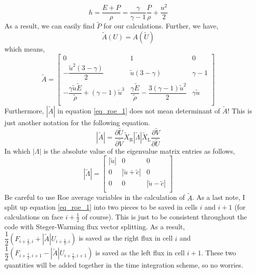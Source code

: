 \documentclass{article}
\begin{document}
\begin{equation*}
h=\dfrac{E+P}{\rho}=\dfrac{\gamma}{\gamma-1}\dfrac{P}{\rho}+\dfrac{u^2}{2}
\end{equation*}
As a result, we can easily find $\tilde{P}$ for our calculations. Further, we have,
\begin{equation*}
\tilde{A}(U)=A(\tilde{U})
\end{equation*}
which means,
\begin{equation*}
\tilde{A}=
\left[
\begin{matrix}
0 & 1 & 0 \\[10pt]
-\dfrac{\tilde{u}^2 (3-\gamma)}{2} & \tilde{u}(3-\gamma)& \gamma-1\\[10pt]
-\dfrac{\gamma \tilde{u} \tilde{E}}{\tilde{\rho}} +(\gamma-1) \tilde{u}^3 & \dfrac{\gamma \tilde{E}}{\tilde{\rho}}-\dfrac{3(\gamma-1) \tilde{u}^2}{2} & \gamma \tilde{u}\\
\end{matrix}
\right]
\end{equation*}
Furthermore, $|\tilde{A}|$ in  equation \ref{eq_roe_1} does not mean determinant of $\tilde{A}$! This is just another notation for the following equation.
\begin{equation*}
|\tilde{A}|=\dfrac{\partial \tilde{U}}{\partial \tilde{V}}\tilde{X}_{\text{R}} |\tilde{\Lambda}| \tilde{X}_{\text{L}}\dfrac{\partial \tilde{V}}{\partial \tilde{U}}
\end{equation*}
In which $|\Lambda|$ is the absolute value of the eigenvalue matrix entries as follows,
\begin{equation*}
|\tilde{\Lambda}|=
\left[
\begin{matrix}
|\tilde{u}| & 0 &0 \\[5pt]
0 & |\tilde{u}+\tilde{c}| &0 \\[5pt]
0 & 0 &|\tilde{u}-\tilde{c}| \\
\end{matrix}
\right]
\end{equation*}
Be careful to use Roe average variables in the calculation of $\tilde{A}$. As a last note, I split up equation \ref{eq_roe_1} into two pieces to be saved in cells $i$ and $i+1$ (for calculations on face $i+\frac{1}{2}$ of course). This is just to be consistent throughout the code with Steger-Warming flux vector splitting. As a result, $\dfrac{1}{2}\left(F_{i+\frac{1}{2},i}+ |\tilde{A}|  U_{i+\frac{1}{2},i}\right)$ is saved as the right flux in cell $i$ and $\dfrac{1}{2}\left(F_{i+\frac{1}{2},i+1} - |\tilde{A}| U_{i+\frac{1}{2},i+1} \right)$ is saved as the left flux in cell $i+1$. These two quantities will be added together in the time integration scheme, so no worries.
\end{document}
